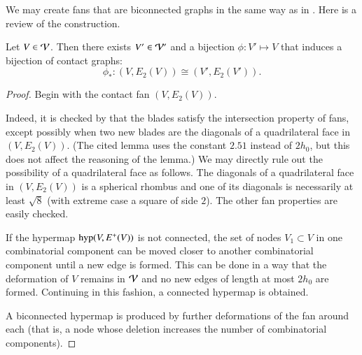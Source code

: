 \documentclass{llncs}
\def\op#1{{\hbox{#1}}}
\begin{document}
We may create  fans that are biconnected graphs in the same way as in
\cite{Hales:2006:DCG}.  Here is a review
of the construction.




\begin{lemma}\label{lemma:V'-bi} 
Let $V\in {\mathcal V}$.  Then there exists $V'\in {\mathcal V}'$ and a bijection 
 $\phi:V'\mapsto V$ that induces a bijection
  of contact graphs:
\[
\phi_*:(V,E_2(V)) \cong (V',E_2(V')).
\]
\end{lemma}


\begin{proof}
  Begin with the contact fan $(V,E_2(V))$.  

   Indeed, it is checked by
  \cite[Lemma~4.30]{Hales:2006:DCG} that the blades satisfy the
  intersection property of fans, except possibly when two new blades
  are the diagonals of a quadrilateral face in $(V,E_2(V))$.  (The
  cited lemma uses the constant $2.51$ instead of $2h_0$, but this
  does not affect the reasoning of the lemma.) 
We may directly rule out the possibility of a quadrilateral face as follows.
 The diagonals of a quadrilateral face
  in $(V,E_2(V))$ is a spherical rhombus and one of its diagonals is
  necessarily at least $\sqrt8$ (with extreme case a square of side
  $2$).  The other fan properties are easily checked.

  If the hypermap $\op{hyp}(V,E^+(V))$ is not connected,
  the set of nodes $V_1\subset V$ in one combinatorial component can
  be moved closer to another combinatorial component until a new edge
  is formed.  This can be done in a way that the deformation of $V$
  remains in ${\mathcal V}$ and no new edges of length at most $2h_0$ are formed.
  Continuing in this fashion, a connected hypermap is obtained.

A biconnected hypermap is produced by  further
 deformations of the fan around each   (that is, a node 
whose deletion increases the number of combinatorial components).
\end{proof}
\end{document}
